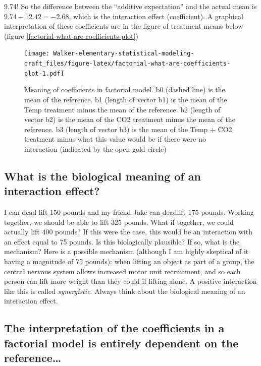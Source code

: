 \documentclass[]{book}
\begin{document}
9.74! So the difference between the ``additive expectation'' and the actual mean is \(9.74 - 12.42 = -2.68\), which is the interaction effect (coefficient). A graphical interpretation of these coefficients are in the figure of treatment means below (figure \ref{factorial-what-are-coefficients-plot})

\begin{figure}
\centering
\texttt{[image: Walker-elementary-statistical-modeling-draft\_files/figure-latex/factorial-what-are-coefficients-plot-1.pdf]}
\caption{\label{fig:factorial-what-are-coefficients-plot}Meaning of coefficients in factorial model. b0 (dashed line) is the mean of the reference. b1 (length of vector b1) is the mean of the Temp treatment minus the mean of the reference. b2 (length of vector b2) is the mean of the CO2 treatment minus the mean of the reference. b3 (length of vector b3) is the mean of the Temp + CO2 treatment minus what this value would be if there were no interaction (indicated by the open gold circle)}
\end{figure}

\hypertarget{what-is-the-biological-meaning-of-an-interaction-effect}{%
\subsection{What is the biological meaning of an interaction effect?}\label{what-is-the-biological-meaning-of-an-interaction-effect}}

I can dead lift 150 pounds and my friend Jake can deadlift 175 pounds. Working together, we should be able to lift 325 pounds. What if together, we could actually lift 400 pounds? If this were the case, this would be an interaction with an effect equal to 75 pounds. Is this biologically plausible? If so, what is the mechanism? Here is a possible mechanism (although I am highly skeptical of it having a magnitude of 75 pounds): when lifting an object as part of a group, the central nervous system allows increased motor unit recruitment, and so each person can lift more weight than they could if lifting alone. A positive interaction like this is called \emph{synergistic}. Always think about the biological meaning of an interaction effect.

\hypertarget{the-interpretation-of-the-coefficients-in-a-factorial-model-is-entirely-dependent-on-the-reference}{%
\subsection{The interpretation of the coefficients in a factorial model is entirely dependent on the reference\ldots{}}\label{the-interpretation-of-the-coefficients-in-a-factorial-model-is-entirely-dependent-on-the-reference}}
\end{document}
